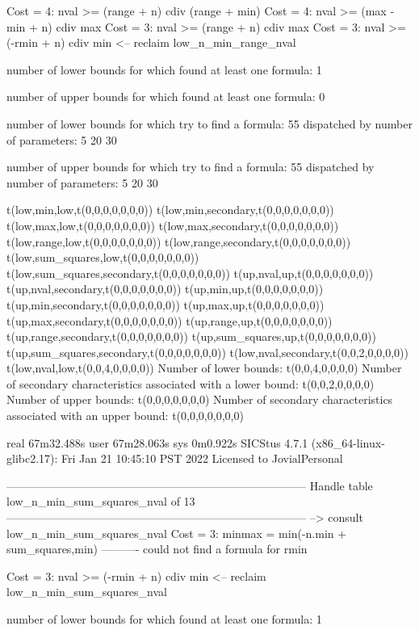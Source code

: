 Cost =  4:  nval >= (range + n) cdiv (range + min)
Cost =  4:  nval >= (max - min + n) cdiv max
Cost =  3:  nval >= (range + n) cdiv max
Cost =  3:  nval >= (-rmin + n) cdiv min
<-- reclaim low_n_min_range_nval

number of lower bounds for which found at least one formula: 1

number of upper bounds for which found at least one formula: 0

number of lower bounds for which try to find a formula: 55
dispatched by number of parameters: 5  20  30

number of upper bounds for which try to find a formula: 55
dispatched by number of parameters: 5  20  30

t(low,min,low,t(0,0,0,0,0,0,0))
t(low,min,secondary,t(0,0,0,0,0,0,0))
t(low,max,low,t(0,0,0,0,0,0,0))
t(low,max,secondary,t(0,0,0,0,0,0,0))
t(low,range,low,t(0,0,0,0,0,0,0))
t(low,range,secondary,t(0,0,0,0,0,0,0))
t(low,sum_squares,low,t(0,0,0,0,0,0,0))
t(low,sum_squares,secondary,t(0,0,0,0,0,0,0))
t(up,nval,up,t(0,0,0,0,0,0,0))
t(up,nval,secondary,t(0,0,0,0,0,0,0))
t(up,min,up,t(0,0,0,0,0,0,0))
t(up,min,secondary,t(0,0,0,0,0,0,0))
t(up,max,up,t(0,0,0,0,0,0,0))
t(up,max,secondary,t(0,0,0,0,0,0,0))
t(up,range,up,t(0,0,0,0,0,0,0))
t(up,range,secondary,t(0,0,0,0,0,0,0))
t(up,sum_squares,up,t(0,0,0,0,0,0,0))
t(up,sum_squares,secondary,t(0,0,0,0,0,0,0))
t(low,nval,secondary,t(0,0,2,0,0,0,0))
t(low,nval,low,t(0,0,4,0,0,0,0))
Number of lower bounds:                                             t(0,0,4,0,0,0,0)
Number of secondary characteristics associated with a lower bound:  t(0,0,2,0,0,0,0)
Number of upper bounds:                                             t(0,0,0,0,0,0,0)
Number of secondary characteristics associated with an upper bound: t(0,0,0,0,0,0,0)

real	67m32.488s
user	67m28.063s
sys	0m0.922s
SICStus 4.7.1 (x86_64-linux-glibc2.17): Fri Jan 21 10:45:10 PST 2022
Licensed to JovialPersonal


--------------------------------------------------------------------------------
Handle table low_n_min_sum_squares_nval of 13
--------------------------------------------------------------------------------
--> consult low_n_min_sum_squares_nval
Cost =  3:  minmax = min(-n.min + sum_squares,min)
----------
could not find a formula for rmin

Cost =  3:  nval >= (-rmin + n) cdiv min
<-- reclaim low_n_min_sum_squares_nval

number of lower bounds for which found at least one formula: 1

